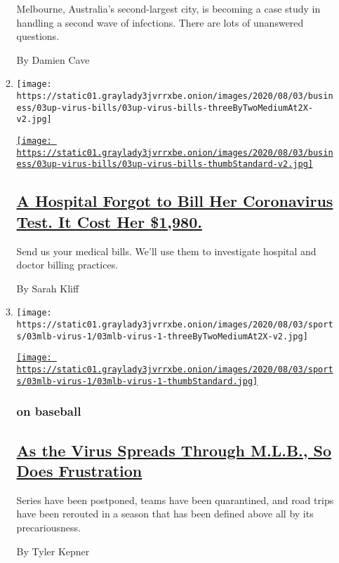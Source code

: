 \begin{enumerate}
\begin{enumerate}
    Melbourne, Australia's second-largest city, is becoming a case study
    in handling a second wave of infections. There are lots of
    unanswered questions.

    By Damien Cave
  \item
    \texttt{[image: https://static01.graylady3jvrrxbe.onion/images/2020/08/03/business/03up-virus-bills/03up-virus-bills-threeByTwoMediumAt2X-v2.jpg]}

    \href{/2020/08/03/upshot/nj-coronavirus-medical-bill.html}{\texttt{[image: https://static01.graylady3jvrrxbe.onion/images/2020/08/03/business/03up-virus-bills/03up-virus-bills-thumbStandard-v2.jpg]}}

    \hypertarget{a-hospital-forgot-to-bill-her-coronavirus-test-it-cost-her-1980}{%
    \subsection{\texorpdfstring{\href{/2020/08/03/upshot/nj-coronavirus-medical-bill.html}{A
    Hospital Forgot to Bill Her Coronavirus Test. It Cost Her
    \$1,980.}}{A Hospital Forgot to Bill Her Coronavirus Test. It Cost Her \$1,980.}}\label{a-hospital-forgot-to-bill-her-coronavirus-test-it-cost-her-1980}}

    Send us your medical bills. We'll use them to investigate hospital
    and doctor billing practices.

    By Sarah Kliff
  \item
    \texttt{[image: https://static01.graylady3jvrrxbe.onion/images/2020/08/03/sports/03mlb-virus-1/03mlb-virus-1-threeByTwoMediumAt2X-v2.jpg]}

    \href{/2020/08/03/sports/baseball/mlb-coronavirus-outbreak.html}{\texttt{[image: https://static01.graylady3jvrrxbe.onion/images/2020/08/03/sports/03mlb-virus-1/03mlb-virus-1-thumbStandard.jpg]}}

    \hypertarget{on-baseball}{%
    \subsubsection{on baseball}\label{on-baseball}}

    \hypertarget{as-the-virus-spreads-through-mlb-so-does-frustration}{%
    \subsection{\texorpdfstring{\href{/2020/08/03/sports/baseball/mlb-coronavirus-outbreak.html}{As
    the Virus Spreads Through M.L.B., So Does
    Frustration}}{As the Virus Spreads Through M.L.B., So Does Frustration}}\label{as-the-virus-spreads-through-mlb-so-does-frustration}}

    Series have been postponed, teams have been quarantined, and road
    trips have been rerouted in a season that has been defined above all
    by its precariousness.

    By Tyler Kepner
  \end{enumerate}
\end{enumerate}

